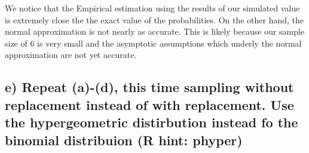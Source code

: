 \documentclass[11pt]{article}\usepackage[]{graphicx}\usepackage[]{color}
\begin{document}
\noindent We notice that the Empirical estimation using the results of our simulated value is extremely close the the exact value of the probabilities. On the other hand, the normal approximation is not nearly as accurate. This is likely because our sample size of 6 is very small and the asymptotic assumptions which underly the normal approximation are not yet accurate.



\subsection*{e) Repeat (a)-(d), this time sampling without replacement instead of with replacement. Use the hypergeometric distirbution instead fo the binomial distribuion (R hint: phyper)}
\end{document}
